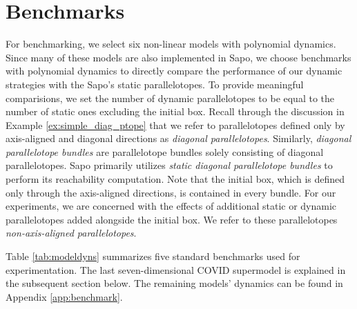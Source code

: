 \section{Benchmarks}
\label{sec:benchmarks}
For benchmarking, we select six non-linear models with polynomial dynamics.
%
Since many of these models are also implemented in Sapo, we choose benchmarks with polynomial dynamics to directly compare the performance of our dynamic strategies with the Sapo's static parallelotopes. To provide meaningful comparisions, we set the number of dynamic parallelotopes to be equal to the number of static ones excluding the initial box.
%
Recall through the discussion in Example \ref{ex:simple_diag_ptope} that we refer to parallelotopes defined only by axis-aligned and diagonal directions as \emph{diagonal parallelotopes}.
%
Similarly, \emph{diagonal parallelotope bundles} are parallelotope bundles solely consisting of diagonal parallelotopes. Sapo primarily utilizes \emph{static diagonal parallelotope bundles} to perform its reachability computation.
%
Note that the initial box, which is defined only through the axis-aligned directions, is contained in every bundle.
%
For our experiments, we are concerned with the effects of additional static or dynamic parallelotopes added alongside the initial box. We refer to these parallelotopes \emph{non-axis-aligned parallelotopes}.

Table \ref{tab:modeldyns} summarizes five standard benchmarks used for experimentation. The last seven-dimensional COVID supermodel is explained in the subsequent section below. The remaining models' dynamics can be found in Appendix \ref{app:benchmark}.



\def \voltablespace {-0.8cm}

